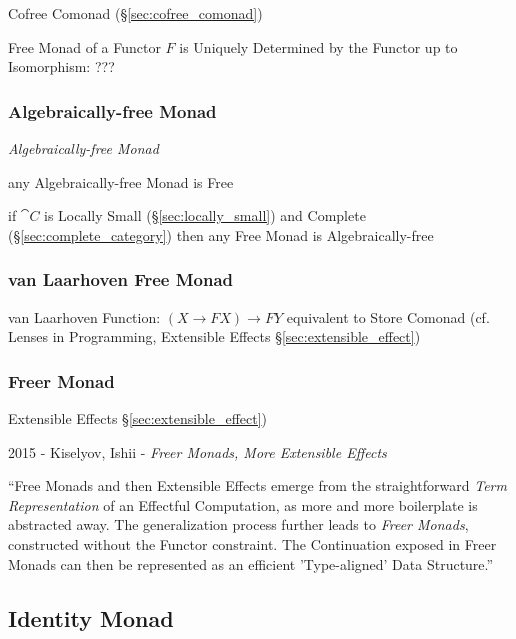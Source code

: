 Cofree Comonad (\S\ref{sec:cofree_comonad})

Free Monad of a Functor $F$ is Uniquely Determined by the Functor up
to Isomorphism: ??? %



\subsubsection{Algebraically-free Monad}\label{sec:algebraically_free}

\emph{Algebraically-free Monad}

any Algebraically-free Monad is Free

if $\cat{C}$ is Locally Small (\S\ref{sec:locally_small}) and Complete
(\S\ref{sec:complete_category}) then any Free Monad is
Algebraically-free



\subsubsection{van Laarhoven Free Monad}
\label{sec:vanlaarhoven_free_monad}

van Laarhoven Function: $(X \rightarrow F X) \rightarrow F Y$
equivalent to Store Comonad (cf. Lenses in Programming, Extensible
Effects \S\ref{sec:extensible_effect})



\subsubsection{Freer Monad}\label{sec:freer_monad}

Extensible Effects \S\ref{sec:extensible_effect})

2015 - Kiselyov, Ishii - \emph{Freer Monads, More Extensible Effects}

``Free Monads and then Extensible Effects emerge from the straightforward
\emph{Term Representation} of an Effectful Computation, as more and more
boilerplate is abstracted away. The generalization process further leads to
\emph{Freer Monads}, constructed without the Functor constraint. The
Continuation exposed in Freer Monads can then be represented as an efficient
'Type-aligned' Data Structure.''



\subsection{Identity Monad}\label{sec:identity_monad}

